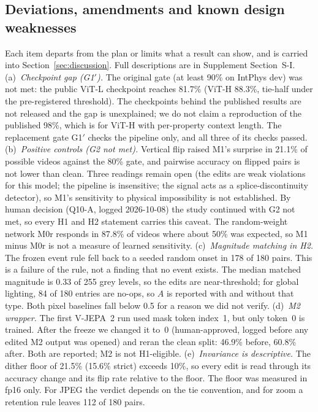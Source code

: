 \subsection{Deviations, amendments and known design weaknesses}
\label{sec:deviations}
Each item departs from the plan or limits what a result can show, and is carried into Section~\ref{sec:discussion}. Full descriptions are in Supplement Section~S-I.
(a)~\emph{Checkpoint gap (G1$'$).} The original gate (at least 90\% on IntPhys dev) was not met: the public ViT-L checkpoint reaches 81.7\% (ViT-H 88.3\%, tie-half under the pre-registered threshold). The checkpoints behind the published results are not released and the gap is unexplained; we do not claim a reproduction of the published 98\%, which is for ViT-H with per-property context length. The replacement gate G1$'$ checks the pipeline only, and all three of its checks passed.
(b)~\emph{Positive controls (G2 not met).} Vertical flip raised M1's surprise in 21.1\% of possible videos against the 80\% gate, and pairwise accuracy on flipped pairs is not lower than clean. Three readings remain open (the edits are weak violations for this model; the pipeline is insensitive; the signal acts as a splice-discontinuity detector), so M1's sensitivity to physical impossibility is not established. By human decision (Q10-A, logged 2026-10-08) the study continued with G2 not met, so every H1 and H2 statement carries this caveat. The random-weight network M0r responds in 87.8\% of videos where about 50\% was expected, so M1 minus M0r is not a measure of learned sensitivity.
(c)~\emph{Magnitude matching in H2.} The frozen event rule fell back to a seeded random onset in 178 of 180 pairs. This is a failure of the rule, not a finding that no event exists. The median matched magnitude is 0.33 of 255 grey levels, so the edits are near-threshold; for global lighting, 84 of 180 entries are no-ops, so $A$ is reported with and without that type. Both pixel baselines fall below 0.5 for a reason we did not verify.
(d)~\emph{M2 wrapper.} The first V-JEPA~2 run used mask token index~1, but only token~0 is trained. After the freeze we changed it to~0 (human-approved, logged before any edited M2 output was opened) and reran the clean split: 46.9\% before, 60.8\% after. Both are reported; M2 is not H1-eligible.
(e)~\emph{Invariance is descriptive.} The dither floor of 21.5\% (15.6\% strict) exceeds 10\%, so every edit is read through its accuracy change and its flip rate relative to the floor. The floor was measured in fp16 only. For JPEG the verdict depends on the tie convention, and for zoom a retention rule leaves 112 of 180 pairs.
